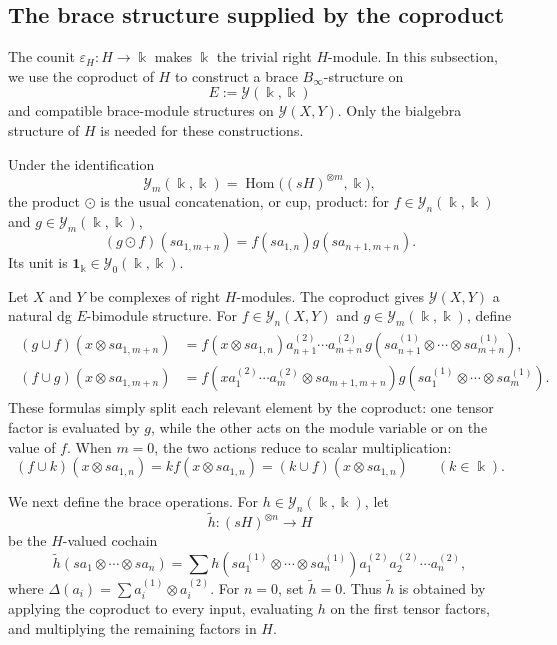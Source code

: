 \documentclass[a4paper, 11pt]{amsart}
\theoremstyle{definition}
\theoremstyle{remark}
\numberwithin{equation}{section}
\newcommand{\Y}{\mathcal{Y}}
\newcommand{\id}{\mathbf{1}}
\begin{document}
\subsection{The brace structure supplied by the coproduct}\label{subsection:binfinitybialgebra}
The counit $\varepsilon_H\colon H\to\Bbbk$ makes $\Bbbk$ the trivial right $H$-module. In this subsection, we use the coproduct of $H$ to construct a brace $B_\infty$-structure on
\[
E:=\Y(\Bbbk,\Bbbk)
\]
and compatible brace-module structures on $\Y(X,Y)$. Only the bialgebra structure of $H$ is needed for these constructions.

Under the identification
\[
\Y_m(\Bbbk,\Bbbk)=\operatorname{Hom}\bigl((sH)^{\otimes m},\Bbbk\bigr),
\]
the product $\odot$ is the usual concatenation, or cup, product: for $f\in\Y_n(\Bbbk,\Bbbk)$ and $g\in\Y_m(\Bbbk,\Bbbk)$,
\[
(g\odot f)(sa_{1,m+n})=f(sa_{1,n})g(sa_{n+1,m+n}).
\]
Its unit is $\id_\Bbbk\in\Y_0(\Bbbk,\Bbbk)$.

Let $X$ and $Y$ be complexes of right $H$-modules. The coproduct gives $\Y(X,Y)$ a natural dg $E$-bimodule structure. For $f\in\Y_n(X,Y)$ and $g\in\Y_m(\Bbbk,\Bbbk)$, define
\begin{align}\label{align:cupproducts}
\begin{aligned}
(g\cup f)(x\otimes sa_{1,m+n})
 & = f(x\otimes sa_{1,n})a^{(2)}_{n+1}\cdots a^{(2)}_{m+n}\,
 g(sa^{(1)}_{n+1}\otimes\cdots\otimes sa^{(1)}_{m+n}),\\
(f\cup g)(x\otimes sa_{1,m+n})
 & = f(xa^{(2)}_1\cdots a^{(2)}_m\otimes sa_{m+1,m+n})
 g(sa^{(1)}_1\otimes\cdots\otimes sa^{(1)}_m).
\end{aligned}
\end{align}
These formulas simply split each relevant element by the coproduct: one tensor factor is evaluated by $g$, while the other acts on the module variable or on the value of $f$. When $m=0$, the two actions reduce to scalar multiplication:
\[
(f\cup k)(x\otimes sa_{1,n})=k f(x\otimes sa_{1,n})=(k\cup f)(x\otimes sa_{1,n})
\qquad(k\in\Bbbk).
\]

We next define the brace operations. For $h\in\Y_n(\Bbbk,\Bbbk)$, let
\[
\widetilde h\colon(sH)^{\otimes n}\longrightarrow H
\]
be the $H$-valued cochain
\[
\widetilde h(sa_1\otimes\cdots\otimes sa_n)
 =\sum h(sa_1^{(1)}\otimes\cdots\otimes sa_n^{(1)})a_1^{(2)}a_2^{(2)}\cdots a_n^{(2)},
\]
where $\Delta(a_i)=\sum a_i^{(1)}\otimes a_i^{(2)}$. For $n=0$, set $\widetilde h=0$. Thus $\widetilde h$ is obtained by applying the coproduct to every input, evaluating $h$ on the first tensor factors, and multiplying the remaining factors in $H$.
\end{document}
